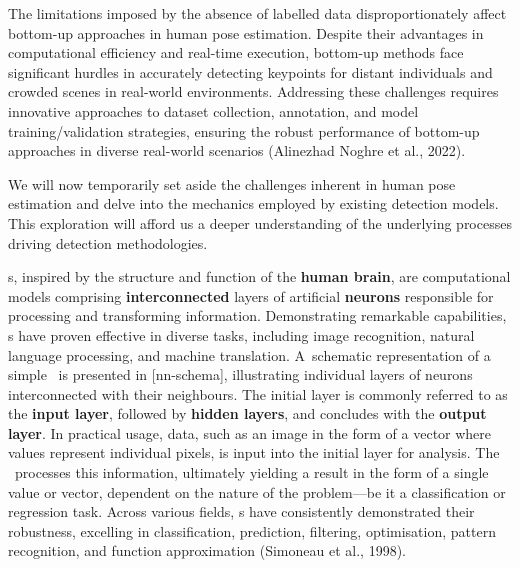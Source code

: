 The limitations imposed by the absence of labelled data disproportionately affect bottom-up approaches in human pose estimation. Despite their advantages in computational efficiency and real-time execution, bottom-up methods face significant hurdles in accurately detecting keypoints for distant individuals and crowded scenes in real-world environments. Addressing these challenges requires innovative approaches to dataset collection, annotation, and model training/validation strategies, ensuring the robust performance of bottom-up approaches in diverse real-world scenarios (\scc Alinezhad Noghre et al., 2022).

We will now temporarily set aside the challenges inherent in human pose estimation and delve into the mechanics employed by existing detection models. This exploration will afford us a deeper understanding of the underlying processes driving detection methodologies.

\NN\-s, inspired by the structure and function of the {\bf human brain}, are computational models comprising {\bf interconnected} layers of artificial {\bf neurons} responsible for processing and transforming information. Demonstrating remarkable capabilities, \NN\-s have proven effective in diverse tasks, including image recognition, natural language processing, and machine translation. A~schematic representation of a simple \NN\ is presented in [nn-schema], illustrating individual layers of neurons interconnected with their neighbours. The initial layer is commonly referred to as the {\bf input layer}, followed by {\bf hidden layers}, and concludes with the {\bf output layer}. In practical usage, data, such as an image in the form of a vector where values represent individual pixels, is input into the initial layer for analysis. The \NN\ processes this information, ultimately yielding a result in the form of a single value or vector, dependent on the nature of the problem—be it a classification or regression task. Across various fields, \NN\-s have consistently demonstrated their robustness, excelling in classification, prediction, filtering, optimisation, pattern recognition, and function approximation (\scc Simoneau et al., 1998).


